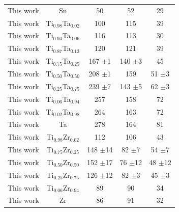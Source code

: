 \begin{longtable}[H]{ c c c c c}
	This work & Sn & 50 & 52 & 29\\
	This work & Ti$_{0.98}$Ta$_{0.02}$ & 100 & 115 & 39 \\
	This work & Ti$_{0.94}$Ta$_{0.06}$ & 116 & 113 & 30 \\
	This work & Ti$_{0.87}$Ta$_{0.13}$ & 120 & 121 & 39 \\
	This work & Ti$_{0.75}$Ta$_{0.25}$ & 167 $\pm$1 & 140 $\pm$3 & 45\\
	This work & Ti$_{0.50}$Ta$_{0.50}$ & 208 $\pm$1 & 159 & 51 $\pm$3\\
	This work & Ti$_{0.25}$Ta$_{0.75}$ & 239 $\pm$7 & 143 $\pm$5 & 62 $\pm$3\\
	This work & Ti$_{0.06}$Ta$_{0.94}$ & 257 & 158 & 72\\
	This work & Ti$_{0.02}$Ta$_{0.98}$ & 264 & 163 & 72\\
	This work & Ta & 278 & 164 & 81\\
	This work & Ti$_{0.98}$Zr$_{0.02}$ & 112 & 106 & 43\\
	This work & Ti$_{0.75}$Zr$_{0.25}$ & 148 $\pm$14 & 82 $\pm$7 & 54 $\pm$7\\
	This work & Ti$_{0.50}$Zr$_{0.50}$ & 152 $\pm$17 & 76 $\pm$12 & 48 $\pm$12\\
	This work & Ti$_{0.25}$Zr$_{0.75}$ & 126 $\pm$12 & 82 $\pm$3 & 45 $\pm$3\\
	This work & Ti$_{0.06}$Zr$_{0.94}$ & 89 & 90 & 34\\
	This work & Zr & 86 & 91 & 32\\
	\hline
\end{longtable}

